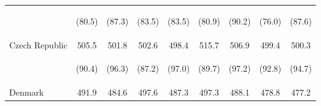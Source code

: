 \begin{center}
\begin{tabular}{lcccccccc}
 & \begin{footnotesize}(80.5)\end{footnotesize} & \begin{footnotesize}(87.3)\end{footnotesize} & \begin{footnotesize}(83.5)\end{footnotesize} & \begin{footnotesize}(83.5)\end{footnotesize} & \begin{footnotesize}(80.9)\end{footnotesize} & \begin{footnotesize}(90.2)\end{footnotesize} & \begin{footnotesize}(76.0)\end{footnotesize} & \begin{footnotesize}(87.6)\end{footnotesize}\\
\noalign{\smallskip}Czech Republic & 505.5 & 501.8 & 502.6 & 498.4 & 515.7 & 506.9 & 499.4 & 500.3\\
 & \begin{footnotesize}(90.4)\end{footnotesize} & \begin{footnotesize}(96.3)\end{footnotesize} & \begin{footnotesize}(87.2)\end{footnotesize} & \begin{footnotesize}(97.0)\end{footnotesize} & \begin{footnotesize}(89.7)\end{footnotesize} & \begin{footnotesize}(97.2)\end{footnotesize} & \begin{footnotesize}(92.8)\end{footnotesize} & \begin{footnotesize}(94.7)\end{footnotesize}\\
\noalign{\smallskip}Denmark & 491.9 & 484.6 & 497.6 & 487.3 & 497.3 & 488.1 & 478.8 & 477.2\\

\end{tabular}
\end{center}
